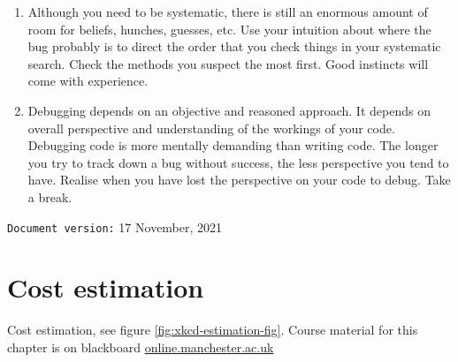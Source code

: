 \documentclass[
]{book}
\begin{document}
\begin{enumerate}
\item
  Although you need to be systematic, there is still an enormous amount of room for beliefs, hunches, guesses, etc. Use your intuition about where the bug probably is to direct the order that you check things in your systematic search. Check the methods you suspect the most first. Good instincts will come with experience.
\item
  Debugging depends on an objective and reasoned approach. It depends on overall perspective and understanding of the workings of your code. Debugging code is more mentally demanding than writing code. The longer you try to track down a bug without success, the less perspective you tend to have. Realise when you have lost the perspective on your code to debug. Take a break.
\end{enumerate}

\texttt{Document\ version:} 17 November, 2021

\hypertarget{estimating}{%
\chapter{Cost estimation}\label{estimating}}

Cost estimation, see figure \ref{fig:xkcd-estimation-fig}. Course material for this chapter is on blackboard \href{https://online.manchester.ac.uk}{online.manchester.ac.uk}
\end{document}

